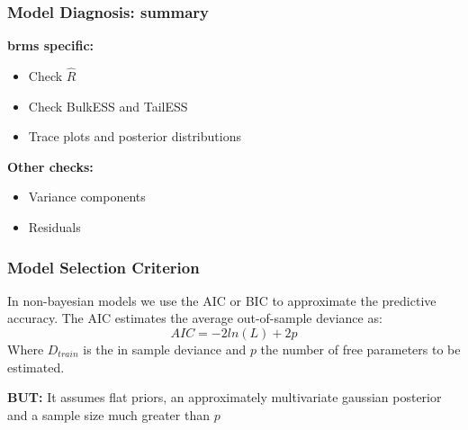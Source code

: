 \documentclass{beamer}
\newenvironment{VerbatimIN}
 {\VerbatimEnvironment
  \begin{tcolorbox}[
    breakable,
    colback=lightgray,
    spartan
  ]%
  \begin{Verbatim}}
 {\end{Verbatim}\end{tcolorbox}}
\begin{document}

\begin{frame}
    \frametitle{Model Diagnosis: summary}
    \large
    \textbf{brms specific:}
    \begin{itemize}
        \item Check $\hat{R}$
        \item Check Bulk\textunderscore ESS and Tail\textunderscore ESS 
        \item Trace plots and posterior distributions
    \end{itemize}
    \vspace{0.2cm}

    \textbf{Other checks:}
    \begin{itemize}
        \item Variance components
        \item Residuals
    \end{itemize}
\end{frame}

\begin{frame}
    \frametitle{Model Selection Criterion}
    \large
    In non-bayesian models we use the AIC or BIC to approximate the predictive accuracy. The AIC estimates the average out-of-sample deviance as:
    \[
    AIC = -2ln(L) + 2p
    \]
    Where $D_{train}$ is the in sample deviance and $p$ the number of free parameters to be estimated. \vspace{0.2cm}

    \textbf{BUT:} It assumes flat priors, an approximately multivariate gaussian posterior and a sample size much greater than $p$
\end{frame}
\end{document}
